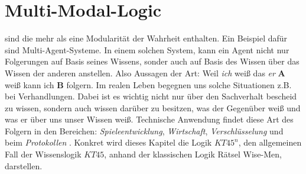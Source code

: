 

\chapter{Multi-Modal-Logic} %
\label{sec:multi_modal_logic}
\MML sind \NML die mehr als eine Modularität der Wahrheit enthalten.
Ein Beispiel dafür sind Multi-Agent-Systeme. 
In einem solchen System, kann ein Agent nicht nur Folgerungen auf Basis seines Wissens, sonder auch auf Basis des Wissen über das Wissen der anderen anstellen. 
Also Aussagen der Art: Weil \emph{ich} weiß das \emph{er} \textbf{A} weiß kann ich \textbf{B} folgern.
Im realen Leben begegnen uns solche Situationen z.B. bei Verhandlungen.
Dabei ist es wichtig nicht nur über den Sachverhalt bescheid zu wissen, sondern auch wissen darüber zu besitzen, was der Gegenüber weiß und was er über uns unser Wissen weiß.
Technische Anwendung findet diese Art des Folgern in den Bereichen: \emph{Spieleentwicklung}, \emph{Wirtschaft}, \emph{Verschlüsselung} und beim \emph{Protokollen} .
Konkret wird dieses Kapitel die Logik $KT45^n$, den allgemeinen Fall der Wissenslogik 
$KT45$, anhand der klassischen Logik Rätsel Wise-Men, darstellen.




